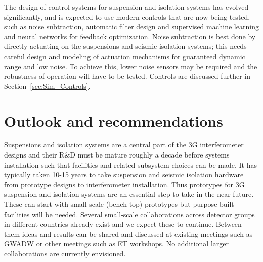  The design of control systems for suspension and isolation systems has evolved significantly, and is expected to use modern controls that are now being tested, such as noise subtraction, automatic filter design and supervised machine learning and neural networks for feedback optimization. 
Noise subtraction is best done by directly actuating on the suspensions and seismic isolation systems; this needs careful design and modeling of actuation mechanisms for guaranteed dynamic range and low noise.  To achieve this, lower noise sensors may be required and the robustness of operation will have to be tested. Controls are discussed further in Section~\ref{sec:Sim_Controls}.

\section{Outlook and recommendations}


Suspensions and isolation systems are a central part of the 3G interferometer designs and their R\&D must be mature roughly a decade before systems installation such that facilities and related subsystem choices can be made. It has typically taken 10-15 years to take suspension and seismic isolation hardware from prototype designs to interferometer installation. Thus prototypes for 3G suspension and isolation systems are an essential step to take in the near future. These can start with small scale (bench top) prototypes but purpose built facilities will be needed.  Several small-scale collaborations across detector groups in different countries already exist and we expect these to continue. Between them ideas and results can be shared and discussed at existing meetings such as GWADW or other meetings such as ET workshops. No additional larger collaborations are currently envisioned. 


